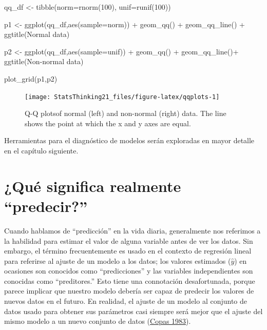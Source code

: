 \documentclass[
  12pt,
]{book}
\newenvironment{Shaded}{\begin{snugshade}}{\end{snugshade}}
\newcommand{\AttributeTok}[1]{\textcolor[rgb]{0.77,0.63,0.00}{#1}}
\newcommand{\DecValTok}[1]{\textcolor[rgb]{0.00,0.00,0.81}{#1}}
\newcommand{\FunctionTok}[1]{\textcolor[rgb]{0.00,0.00,0.00}{#1}}
\newcommand{\NormalTok}[1]{#1}
\newcommand{\OtherTok}[1]{\textcolor[rgb]{0.56,0.35,0.01}{#1}}
\newcommand{\SpecialCharTok}[1]{\textcolor[rgb]{0.00,0.00,0.00}{#1}}
\newcommand{\StringTok}[1]{\textcolor[rgb]{0.31,0.60,0.02}{#1}}
\begin{document}
\begin{Shaded}
\begin{Highlighting}[]
\NormalTok{qq\_df }\OtherTok{\textless{}{-}} \FunctionTok{tibble}\NormalTok{(}\AttributeTok{norm=}\FunctionTok{rnorm}\NormalTok{(}\DecValTok{100}\NormalTok{),}
                \AttributeTok{unif=}\FunctionTok{runif}\NormalTok{(}\DecValTok{100}\NormalTok{))}

\NormalTok{p1 }\OtherTok{\textless{}{-}} \FunctionTok{ggplot}\NormalTok{(qq\_df,}\FunctionTok{aes}\NormalTok{(}\AttributeTok{sample=}\NormalTok{norm)) }\SpecialCharTok{+} 
  \FunctionTok{geom\_qq}\NormalTok{() }\SpecialCharTok{+} 
  \FunctionTok{geom\_qq\_line}\NormalTok{() }\SpecialCharTok{+} 
  \FunctionTok{ggtitle}\NormalTok{(}\StringTok{\textquotesingle{}Normal data\textquotesingle{}}\NormalTok{)}

\NormalTok{p2 }\OtherTok{\textless{}{-}} \FunctionTok{ggplot}\NormalTok{(qq\_df,}\FunctionTok{aes}\NormalTok{(}\AttributeTok{sample=}\NormalTok{unif)) }\SpecialCharTok{+} 
  \FunctionTok{geom\_qq}\NormalTok{() }\SpecialCharTok{+} 
  \FunctionTok{geom\_qq\_line}\NormalTok{()}\SpecialCharTok{+} 
  \FunctionTok{ggtitle}\NormalTok{(}\StringTok{\textquotesingle{}Non{-}normal data\textquotesingle{}}\NormalTok{)}

\FunctionTok{plot\_grid}\NormalTok{(p1,p2)}
\end{Highlighting}
\end{Shaded}

\begin{figure}
\texttt{[image: StatsThinking21\_files/figure-latex/qqplots-1]} \caption{Q-Q plotsof normal (left) and non-normal (right) data.  The line shows the point at which the x and y axes are equal.}\label{fig:qqplots}
\end{figure}

Herramientas para el diagnóstico de modelos serán exploradas en mayor detalle en el capítulo siguiente.

\hypertarget{quuxe9-significa-realmente-predecir}{%
\section{¿Qué significa realmente ``predecir?''}\label{quuxe9-significa-realmente-predecir}}

Cuando hablamos de ``predicción'' en la vida diaria, generalmente nos referimos a la habilidad para estimar el valor de alguna variable antes de ver los datos. Sin embargo, el término frecuentemente es usado en el contexto de regresión lineal para referirse al ajuste de un modelo a los datos; los valores estimados (\(\hat{y}\)) en ocasiones son conocidos como ``predicciones'' y las variables independientes son conocidas como ``preditores.'' Esto tiene una connotación desafortunada, porque parece implicar que nuestro modelo debería ser capaz de predecir los valores de nuevos datos en el futuro. En realidad, el ajuste de un modelo al conjunto de datos usado para obtener sus parámetros casi siempre será mejor que el ajuste del mismo modelo a un nuevo conjunto de datos (\protect\hyperlink{ref-copa:1983}{Copas 1983}).
\end{document}

